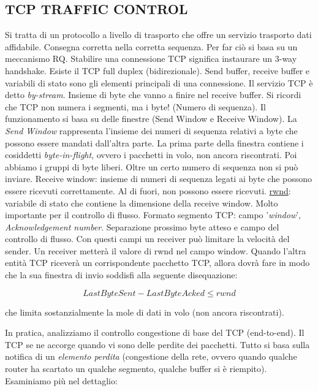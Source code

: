 \subsection{TCP TRAFFIC CONTROL} 

Si tratta di un protocollo a livello di trasporto che offre un servizio trasporto dati affidabile. Consegna corretta nella corretta sequenza. Per far ciò si basa su un meccanismo RQ. Stabilire una connessione TCP significa instaurare un 3-way handshake. Esiste il TCP full duplex (bidirezionale). Send buffer, receive buffer e variabili di stato sono gli elementi principali di una connessione. Il servizio TCP è detto \textit{by-stream}. Insieme di byte che vanno a finire nel receive buffer. Si ricordi che TCP non numera i segmenti, ma i byte! (Numero di sequenza). Il funzionamento si basa su delle finestre (Send Window e Receive Window). La \textit{Send Window} rappresenta l'insieme dei numeri di sequenza relativi a byte che possono essere mandati dall'altra parte. La prima parte della finestra contiene i cosiddetti \textit{byte-in-flight}, ovvero i pacchetti in volo, non ancora riscontrati. Poi abbiamo i gruppi di byte liberi. Oltre un certo numero di sequenza non si può inviare. Receive window: insieme di numeri di sequenza legati ai byte che possono essere ricevuti correttamente. Al di fuori, non possono essere ricevuti.
\newline \underline{rwnd}: variabile di stato che contiene la dimensione della receive window. Molto importante per il controllo di flusso. Formato segmento TCP: campo '\textit{window}', \textit{Acknowledgement number}. Separazione prossimo byte atteso e campo del controllo di flusso. Con questi campi un receiver può limitare la velocità del sender. Un receiver metterà il valore di rwnd nel campo window. Quando l'altra entità TCP riceverà un corrispondente pacchetto TCP, allora dovrà fare in modo che la sua finestra di invio soddisfi alla seguente disequazione:

\[
	LastByteSent - LastByteAcked \leq rwnd
\]

che limita sostanzialmente la mole di dati in volo (non ancora riscontrati).

In pratica, analizziamo il controllo congestione di base del TCP (end-to-end). Il TCP se ne accorge quando vi sono delle perdite dei pacchetti. Tutto si basa sulla notifica di un \textit{elemento perdita} (congestione della rete, ovvero quando qualche router ha scartato un qualche segmento, qualche buffer si è riempito). Esaminiamo più nel dettaglio:

